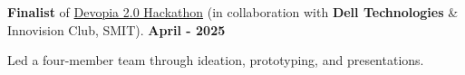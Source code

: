 \begin{zitemize}
\item \textbf{Finalist} of \href{https://www.linkedin.com/posts/thepratikguptaa_devopia2-delltechnologies-innovisionsmit-activity-7320693099700121601-yDfj?utm_source=share&utm_medium=member_desktop&rcm=ACoAAFNTblUBnfiK5ntkG3s1-NXJ0TPqdRrZrz0}{Devopia 2.0 Hackathon} (in collaboration with \textbf{Dell Technologies} \& Innovision Club, SMIT). \hfill \textbf{April - 2025}

Led a four-member team through ideation, prototyping, and presentations.	
\end{zitemize}
 






